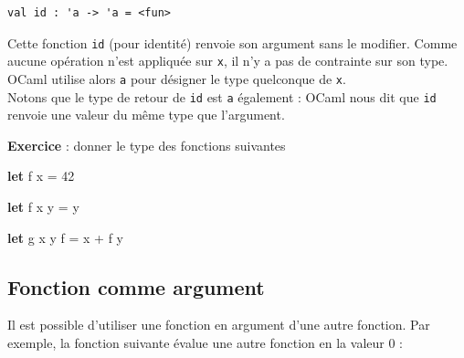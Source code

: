 \documentclass[11pt]{article}
\makeatletter
\newenvironment{Shaded}{}{}
\newcommand{\KeywordTok}[1]{\textcolor[rgb]{0.00,0.44,0.13}{\textbf{{#1}}}}
\newcommand{\DecValTok}[1]{\textcolor[rgb]{0.25,0.63,0.44}{{#1}}}
\newcommand{\NormalTok}[1]{{#1}}
\newcommand{\boxspacing}{\kern\kvtcb@left@rule\kern\kvtcb@boxsep}
\newcommand{\prompt}[4]{
        {\ttfamily\llap{{\color{#2}[#3]:\hspace{3pt}#4}}\vspace{-\baselineskip}}
    }
\makeatother
\begin{document}
            \begin{tcolorbox}[breakable, size=fbox, boxrule=.5pt, pad at break*=1mm, opacityfill=0]
\prompt{Out}{outcolor}{20}{\boxspacing}
\begin{Verbatim}[commandchars=\\\{\}]
val id : 'a -> 'a = <fun>

\end{Verbatim}
\end{tcolorbox}
        
    Cette fonction \texttt{id} (pour identité) renvoie son argument sans le
modifier. Comme aucune opération n'est appliquée sur \texttt{x}, il n'y
a pas de contrainte sur son type. OCaml utilise alors
\texttt{\textquotesingle{}a} pour désigner le type quelconque de
\texttt{x}.\\
Notons que le type de retour de \texttt{id} est
\texttt{\textquotesingle{}a} également : OCaml nous dit que \texttt{id}
renvoie une valeur du même type que l'argument.

    \textbf{Exercice} : donner le type des fonctions suivantes

\begin{Shaded}
\begin{Highlighting}[]
 \KeywordTok{let}\NormalTok{ f x = }\DecValTok{42}
\end{Highlighting}
\end{Shaded}

\begin{Shaded}
\begin{Highlighting}[]
 \KeywordTok{let}\NormalTok{ f x y = y}
\end{Highlighting}
\end{Shaded}

\begin{Shaded}
\begin{Highlighting}[]
 \KeywordTok{let}\NormalTok{ g x y f = x + f y}
\end{Highlighting}
\end{Shaded}

    \hypertarget{fonction-comme-argument}{%
\subsection{Fonction comme argument}\label{fonction-comme-argument}}

Il est possible d'utiliser une fonction en argument d'une autre
fonction. Par exemple, la fonction suivante évalue une autre fonction en
la valeur 0 :
\end{document}
